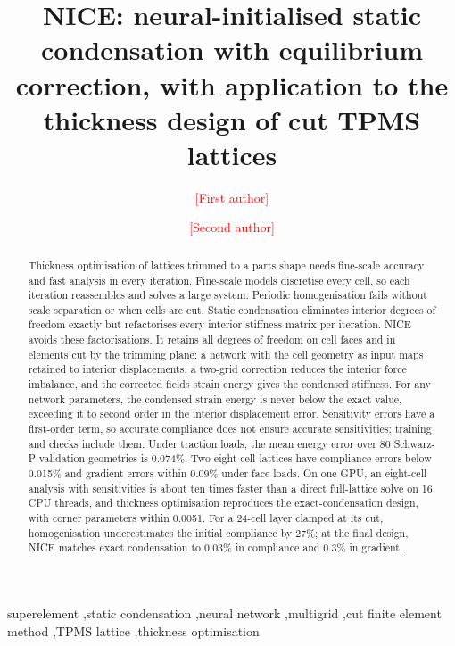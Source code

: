 \documentclass[preprint,12pt,authoryear]{elsarticle}
\begin{document}
\begin{frontmatter}
\title{NICE: neural-initialised static condensation with equilibrium correction, with application to the thickness design of cut TPMS lattices}
\author[a]{\textcolor{red}{[First author]}}
\author[a]{\textcolor{red}{[Second author]}}

\begin{abstract}
Thickness optimisation of lattices trimmed to a part\textquotesingle s shape needs fine-scale accuracy and fast analysis in every iteration. Fine-scale models discretise every cell, so each iteration reassembles and solves a large system. Periodic homogenisation fails without scale separation or when cells are cut. Static condensation eliminates interior degrees of freedom exactly but refactorises every interior stiffness matrix per iteration. NICE avoids these factorisations. It retains all degrees of freedom on cell faces and in elements cut by the trimming plane; a network with the cell geometry as input maps retained to interior displacements, a two-grid correction reduces the interior force imbalance, and the corrected field\textquotesingle s strain energy gives the condensed stiffness. For any network parameters, the condensed strain energy is never below the exact value, exceeding it to second order in the interior displacement error. Sensitivity errors have a first-order term, so accurate compliance does not ensure accurate sensitivities; training and checks include them. Under traction loads, the mean energy error over 80 Schwarz-P validation geometries is 0.074\%. Two eight-cell lattices have compliance errors below 0.015\% and gradient errors within 0.09\% under face loads. On one GPU, an eight-cell analysis with sensitivities is about ten times faster than a direct full-lattice solve on 16 CPU threads, and thickness optimisation reproduces the exact-condensation design, with corner parameters within 0.0051. For a 24-cell layer clamped at its cut, homogenisation underestimates the initial compliance by 27\%; at the final design, NICE matches exact condensation to 0.03\% in compliance and 0.3\% in gradient.
\end{abstract}
\begin{keyword}
superelement \sep static condensation \sep neural network \sep multigrid \sep cut finite element method \sep TPMS lattice \sep thickness optimisation
\end{keyword}
\end{frontmatter}
\end{document}
